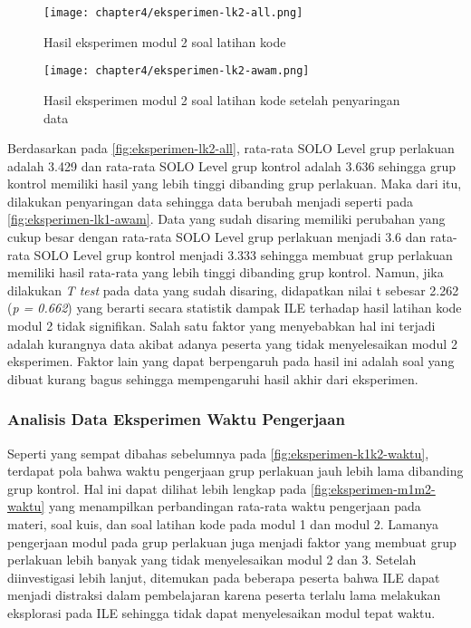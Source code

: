 \begin{figure}[H]
  \centering
  \texttt{[image: chapter4/eksperimen-lk2-all.png]}
  \caption{Hasil eksperimen modul 2 soal latihan kode} \label{fig:eksperimen-lk2-all}
\end{figure}
\begin{figure}[H]
  \centering
  \texttt{[image: chapter4/eksperimen-lk2-awam.png]}
  \caption{Hasil eksperimen modul 2 soal latihan kode setelah penyaringan data} \label{fig:eksperimen-lk2-awam}
\end{figure}

Berdasarkan pada \autoref{fig:eksperimen-lk2-all}, rata-rata SOLO Level grup perlakuan adalah 3.429 dan rata-rata SOLO Level grup kontrol adalah 3.636 sehingga grup kontrol memiliki hasil yang lebih tinggi dibanding grup perlakuan. Maka dari itu, dilakukan penyaringan data sehingga data berubah menjadi seperti pada \autoref{fig:eksperimen-lk1-awam}. Data yang sudah disaring memiliki perubahan yang cukup besar dengan rata-rata SOLO Level grup perlakuan menjadi 3.6 dan rata-rata SOLO Level grup kontrol menjadi 3.333 sehingga membuat grup perlakuan memiliki hasil rata-rata yang lebih tinggi dibanding grup kontrol. Namun, jika dilakukan \textit{T test} pada data yang sudah disaring, didapatkan nilai t sebesar 2.262 (\textit{p = 0.662}) yang berarti secara statistik dampak ILE terhadap hasil latihan kode modul 2 tidak signifikan. Salah satu faktor yang menyebabkan hal ini terjadi adalah kurangnya data akibat adanya peserta yang tidak menyelesaikan modul 2 eksperimen. Faktor lain yang dapat berpengaruh pada hasil ini adalah soal yang dibuat kurang bagus sehingga mempengaruhi hasil akhir dari eksperimen.

\subsubsection{Analisis Data Eksperimen Waktu Pengerjaan}
Seperti yang sempat dibahas sebelumnya pada \autoref{fig:eksperimen-k1k2-waktu}, terdapat pola bahwa waktu pengerjaan grup perlakuan jauh lebih lama dibanding grup kontrol. Hal ini dapat dilihat lebih lengkap pada \autoref{fig:eksperimen-m1m2-waktu} yang menampilkan perbandingan rata-rata waktu pengerjaan pada materi, soal kuis, dan soal latihan kode pada modul 1 dan modul 2. Lamanya pengerjaan modul pada grup perlakuan juga menjadi faktor yang membuat grup perlakuan lebih banyak yang tidak menyelesaikan modul 2 dan 3. Setelah diinvestigasi lebih lanjut, ditemukan pada beberapa peserta bahwa ILE dapat menjadi distraksi dalam pembelajaran karena peserta terlalu lama melakukan eksplorasi pada ILE sehingga tidak dapat menyelesaikan modul tepat waktu.

